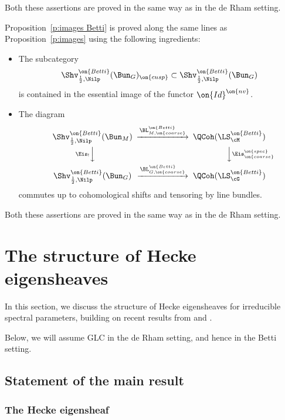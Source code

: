 \documentclass[9pt]{amsart}
\theoremstyle{remark}
\theoremstyle{definition}
\theoremstyle{remark}
\newcommand{\propref}[1]{Proposition~\ref{#1}}
\numberwithin{equation}{section}
\begin{document}
Both these assertions are proved in the same way as in the de Rham setting. 

\sssec{} 

\propref{p:images Betti} is proved along the same lines as \propref{p:images}
using the following ingredients:

\begin{itemize}

\item The subcategory
$$\Shv^{\on{Betti}}_{\frac{1}{2},\Nilp}(\Bun_G)_{\on{cusp}}\subset \Shv^{\on{Betti}}_{\frac{1}{2},\Nilp}(\Bun_G)$$
is contained in the essential image of the functor $\on{Id}^{\on{nv}}$.

\smallskip

\item The diagram 
$$
\CD 
\Shv^{\on{Betti}}_{\frac{1}{2},\Nilp}(\Bun_M) @>{\BL^{\on{Betti}}_{M,\on{coarse}}}>> \QCoh(\LS^{\on{Betti}}_\cM) \\
@V{\Eis_!}VV @VV{\Eis^{\on{spec}}_{\on{coarse}}}V \\
\Shv^{\on{Betti}}_{\frac{1}{2},\Nilp}(\Bun_G)@>{\BL^{\on{Betti}}_{G,\on{coarse}}}>> \QCoh(\LS^{\on{Betti}}_\cG)
\endCD
$$
commutes up to cohomological shifts and tensoring by line bundles.

\end{itemize}

Both these assertions are proved in the same way as in the de Rham setting. 

\section{The structure of Hecke eigensheaves}\label{s:eigensheaves}

In this section, we discuss the structure of Hecke eigensheaves for irreducible
spectral parameters, building on 
recent results from \cite{AGKRRV} and \cite{FR}.

\medskip 
  
Below, we will assume GLC in the de Rham setting, and hence in the Betti setting.

\subsection{Statement of the main result}

\subsubsection{The Hecke eigensheaf}\label{sss:the-eigensheaf}
\end{document}
